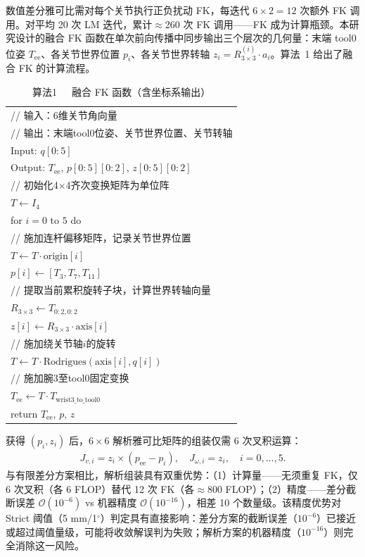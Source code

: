 \documentclass[twocolumn,a4paper,10pt]{ctexart}
\makeatletter
\newenvironment{algotable}[2]{%
  \begin{table}[htbp]
  \centering
  \caption{#2}
  \label{#1}
  \footnotesize\ttfamily
  \begin{tabular}{@{}p{\columnwidth}@{}}
  \toprule
}{%
  \\\bottomrule
  \end{tabular}
  \end{table}
}
\makeatother
\begin{document}
数值差分雅可比需对每个关节执行正负扰动 FK，每迭代 $6\times2=12$ 次额外 FK 调用。对平均 20 次 LM 迭代，累计$\approx$260 次 FK 调用——FK 成为计算瓶颈。本研究设计的融合 FK 函数在单次前向传播中同步输出三个层次的几何量：末端 tool0 位姿 $T_{\mathrm{ee}}$、各关节世界位置 $p_i$、各关节世界转轴 $z_i=R_{3\times3}^{(i)}\cdot a_i$。算法~1 给出了融合 FK 的计算流程。

\begin{algotable}{alg:fk}{算法1~~~融合 FK 函数（含坐标系输出）}
// 输入：6维关节角向量\\
// 输出：末端tool0位姿、关节世界位置、关节转轴\\
Input: $q[0{:}5]$\\
Output: $T_{\mathrm{ee}}$, $p[0{:}5][0{:}2]$, $z[0{:}5][0{:}2]$\\[2pt]
// 初始化4×4齐次变换矩阵为单位阵\\
\quad $T\leftarrow I_4$\\
\quad for $i=0$ to $5$ do\\
// 施加连杆偏移矩阵，记录关节世界位置\\
\qquad $T\leftarrow T\cdot\mathrm{origin}[i]$\\
\qquad $p[i]\leftarrow[T_3,T_7,T_{11}]$\\
// 提取当前累积旋转子块，计算世界转轴向量\\
\qquad $R_{3\times3}\leftarrow T_{0:2,0:2}$\\
\qquad $z[i]\leftarrow R_{3\times3}\cdot\mathrm{axis}[i]$\\
// 施加绕关节轴$i$的旋转\\
\qquad $T\leftarrow T\cdot\mathrm{Rodrigues}(\mathrm{axis}[i],q[i])$\\
// 施加腕3至tool0固定变换\\
\quad $T_{\mathrm{ee}}\leftarrow T\cdot T_{\mathrm{wrist3\_to\_tool0}}$\\
\quad return $T_{\mathrm{ee}}$, $p$, $z$
\end{algotable}

获得 $(p_i,z_i)$ 后，$6\times6$ 解析雅可比矩阵的组装仅需 6 次叉积运算\cite{siciliano2010robotics,buss2004ik}：
\begin{align}
J_{v,i}=z_i\times(p_{\mathrm{ee}}-p_i),\quad J_{\omega,i}=z_i,\quad i=0,\dots,5.
\end{align}
与有限差分方案相比，解析组装具有双重优势：（1）计算量——无须重复 FK，仅 6 次叉积（各 6 FLOP）替代 12 次 FK（各$\approx$800 FLOP）；（2）精度——差分截断误差 $\mathcal{O}(10^{-6})$ vs 机器精度 $\mathcal{O}(10^{-16})$，相差 10 个数量级。该精度优势对 Strict 阈值（5 mm/1$^\circ$）判定具有直接影响：差分方案的截断误差（$10^{-6}$）已接近或超过阈值量级，可能将收敛解误判为失败；解析方案的机器精度（$10^{-16}$）则完全消除这一风险。
\end{document}

